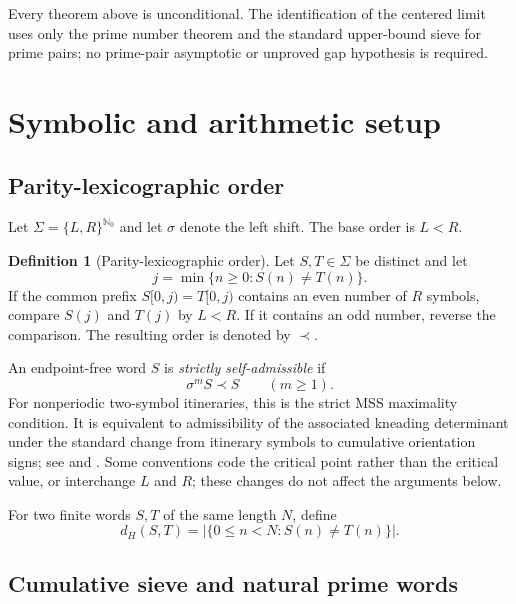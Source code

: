 \documentclass[11pt]{article}
\theoremstyle{definition}
\newtheorem{definition}[theorem]{Definition}
\theoremstyle{remark}
\newcommand{\N}{\mathbb{N}}
\newcommand{\Sig}{\Sigma}
\newcommand{\sh}{\sigma}
\begin{document}
Every theorem above is unconditional.  The identification of the centered limit uses only the prime number theorem and the standard upper-bound sieve for prime pairs; no prime-pair asymptotic or unproved gap hypothesis is required.

\section{Symbolic and arithmetic setup}

\subsection{Parity-lexicographic order}

Let $\Sig=\{L,R\}^{\N_0}$ and let $\sh$ denote the left shift.  The base order is $L<R$.

\begin{definition}[Parity-lexicographic order]\label{def:parity-order}
Let $S,T\in\Sig$ be distinct and let
\[
    j=\min\{n\ge0:S(n)\ne T(n)\}.
\]
If the common prefix $S[0,j)=T[0,j)$ contains an even number of $R$ symbols, compare $S(j)$ and $T(j)$ by $L<R$.  If it contains an odd number, reverse the comparison.  The resulting order is denoted by $\prec$.
\end{definition}

An endpoint-free word $S$ is \emph{strictly self-admissible} if
\begin{equation}\label{eq:strict-admissibility}
    \sh^m S\prec S\qquad(m\ge1).
\end{equation}
For nonperiodic two-symbol itineraries, this is the strict MSS maximality condition.  It is equivalent to admissibility of the associated kneading determinant under the standard change from itinerary symbols to cumulative orientation signs; see \citet{MilnorThurston1988} and \citet{deMeloVanStrien1993}.  Some conventions code the critical point rather than the critical value, or interchange $L$ and $R$; these changes do not affect the arguments below.

For two finite words $S,T$ of the same length $N$, define
\begin{equation}\label{eq:hamming}
    d_H(S,T)=|\{0\le n<N:S(n)\ne T(n)\}|.
\end{equation}

\subsection{Cumulative sieve and natural prime words}
\end{document}
